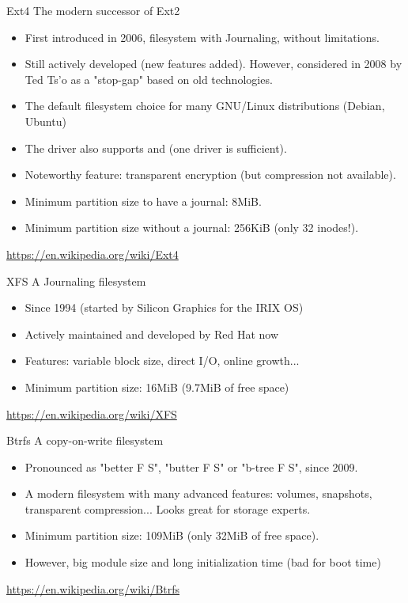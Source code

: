 \begin{frame}{Ext4}
    The modern successor of Ext2
    \begin{itemize}
        \item First introduced in 2006, filesystem with Journaling, without  limitations.
        \item Still actively developed (new features added). However, considered in 2008
              by Ted Ts'o as a "stop-gap" based on old technologies.
        \item The default filesystem choice for many GNU/Linux distributions (Debian, Ubuntu)
        \item The  driver also supports  and  (one driver is sufficient).
        \item Noteworthy feature: transparent encryption (but compression not available).
        \item Minimum partition size to have a journal: 8MiB.
        \item Minimum partition size without a journal: 256KiB (only 32 inodes!).
    \end{itemize}
    \url{https://en.wikipedia.org/wiki/Ext4}
\end{frame}

\begin{frame}{XFS}
    A Journaling filesystem
    \begin{itemize}
        \item Since 1994 (started by Silicon Graphics for the IRIX OS)
        \item Actively maintained and developed by Red Hat now
        \item Features: variable block size, direct I/O, online growth...
        \item Minimum partition size: 16MiB (9.7MiB of free space)
    \end{itemize}
    \url{https://en.wikipedia.org/wiki/XFS}
\end{frame}

\begin{frame}{Btrfs}
    A copy-on-write filesystem
    \begin{itemize}
        \item Pronounced as "better F S", "butter F S" or "b-tree F S", since 2009.
        \item A modern filesystem with many advanced features: volumes, snapshots, transparent compression...
			  Looks great for storage experts.
        \item Minimum partition size: 109MiB (only 32MiB of free space).
        \item However, big module size and long initialization time (bad for boot time)
    \end{itemize}
    \url{https://en.wikipedia.org/wiki/Btrfs}
\end{frame}

